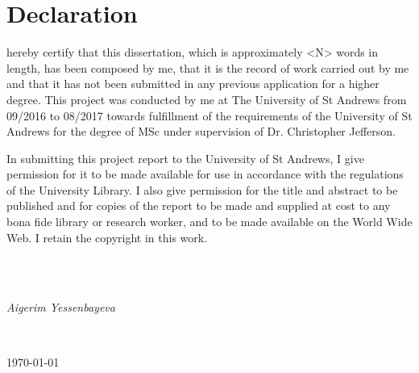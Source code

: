 \chapter*{Declaration}
\begin{SingleSpace}
 hereby certify that this dissertation, which is approximately <N> words in length, has been composed by me, that it is the record of work carried out by me and that it has not been submitted in any previous application for a higher degree. This project was conducted by me at The University of St Andrews from 09/2016 to 08/2017 towards fulfillment of the requirements of the University of St Andrews for the degree of MSc under supervision of Dr. Christopher Jefferson. 

In submitting this project report to the University of St Andrews, I give permission for it to be made available for use in accordance with the regulations of the University Library. I also give permission for the title and abstract to be published and for copies of the report to be made and supplied at cost to any bona fide library or research worker, and to be made available on the World Wide Web. I retain the copyright in this work.

~\\~\\\begin{minipage}{0.4\textwidth}
	    \begin{flushleft} \large
	        \emph{Aigerim Yessenbayeva}
	    \end{flushleft}
    \end{minipage}
    ~
    \begin{minipage}{0.5\textwidth}
	    \begin{flushright} \large
			{\large \today}\\[2cm]
	    \end{flushright}
	\end{minipage}\\[2cm]
\end{SingleSpace}
\clearpage{}